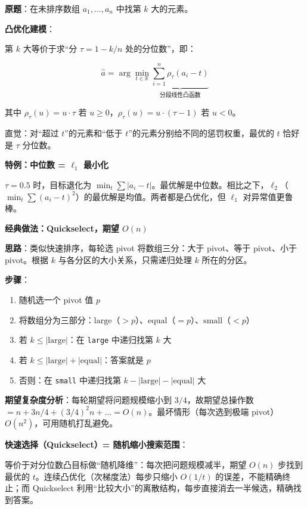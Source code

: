 \documentclass[12pt, a4paper]{ctexart}
\begin{document}
\begin{blackboard}

\textbf{原题}：在未排序数组 $a_1, \ldots, a_n$ 中找第 $k$ 大的元素。

\textbf{凸优化建模}：

第 $k$ 大等价于求``分 $\tau = 1-k/n$ 处的分位数''，即：

$$\hat{a} = \arg\min_{t \in \mathbb{R}} \underbrace{\sum_{i=1}^{n} \rho_\tau(a_i - t)}_{\text{分段线性凸函数}}$$

其中 $\rho_\tau(u) = u \cdot \tau$ 若 $u \geq 0$，$\rho_\tau(u) = u \cdot (\tau - 1)$ 若 $u < 0$。

直觉：对``超过 $t$''的元素和``低于 $t$''的元素分别给不同的惩罚权重，最优的 $t$ 恰好是 $\tau$ 分位数。

\textbf{特例：中位数 = $\ell_1$ 最小化}

$\tau = 0.5$ 时，目标退化为 $\min_t \sum |a_i - t|$。最优解是中位数。相比之下，$\ell_2$（$\min_t \sum(a_i-t)^2$）的最优解是均值。两者都是凸优化，但 $\ell_1$ 对异常值更鲁棒。

\textbf{经典做法：Quickselect，期望 $O(n)$}

\textbf{思路}：类似快速排序，每轮选 pivot 将数组三分：大于 pivot、等于 pivot、小于 pivot。根据 $k$ 与各分区的大小关系，只需递归处理 $k$ 所在的分区。

\textbf{步骤}：
\begin{enumerate}
    \item 随机选一个 pivot 值 $p$
    \item 将数组分为三部分：$\text{large}$（$>p$）、$\text{equal}$（$=p$）、$\text{small}$（$<p$）
    \item 若 $k \leq |\text{large}|$：在 \texttt{large} 中递归找第 $k$ 大
    \item 若 $k \leq |\text{large}|+|\text{equal}|$：答案就是 $p$
    \item 否则：在 \texttt{small} 中递归找第 $k - |\text{large}| - |\text{equal}|$ 大
\end{enumerate}

\textbf{期望复杂度分析}：每轮期望将问题规模缩小到 $3/4$，故期望总操作数 $= n + 3n/4 + (3/4)^2 n + \ldots = O(n)$。最坏情形（每次选到极端 pivot）$O(n^2)$，可用随机打乱避免。

\textbf{快速选择（Quickselect）= 随机缩小搜索范围}：

等价于对分位数凸目标做``随机降维''：每次把问题规模减半，期望 $O(n)$ 步找到最优的 $t$。连续凸优化（次梯度法）每步只缩小 $O(1/t)$ 的误差，不能精确终止；而 Quickselect 利用``比较大小''的离散结构，每步直接消去一半候选，精确找到答案。


\end{blackboard}
\end{document}
